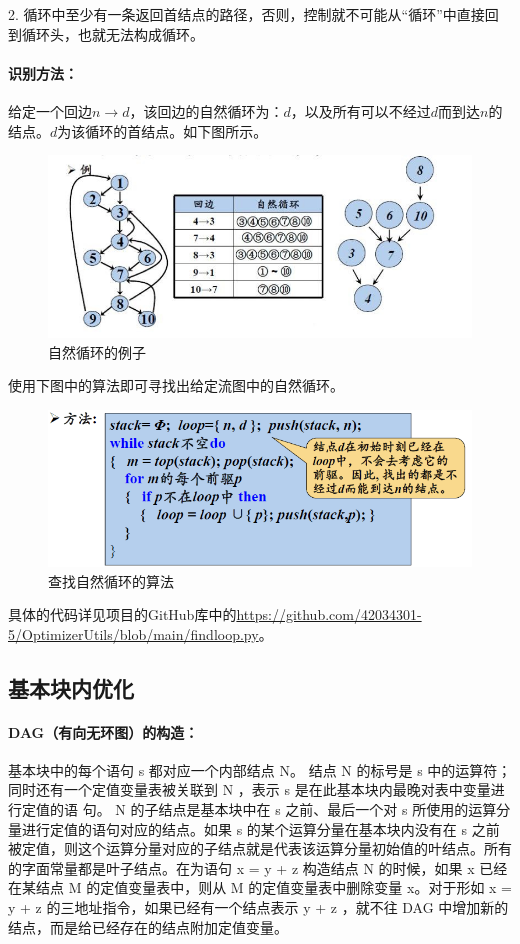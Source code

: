 \documentclass[cn,black,11pt,normal]{elegantnote}
\begin{document}
2. 循环中至少有一条返回首结点的路径，否则，控制就不可能从“循环”中直接回到循环头，也就无法构成循环。

\paragraph{识别方法：}
给定一个回边$n\rightarrow d$，该回边的自然循环为：$d$，以及所有可以不经过$d$而到达$n$的结点。$d$为该循环的首结点。如下图所示。

\begin{figure}[H]
    \centering
    \includegraphics[width=0.8\linewidth]{image/findloop1.jpg}
    \caption{自然循环的例子}
\end{figure}

使用下图中的算法即可寻找出给定流图中的自然循环。

\begin{figure}[H]
    \centering
    \includegraphics[width=0.8\linewidth]{image/findloop2.png}
    \caption{查找自然循环的算法}
\end{figure}

具体的代码详见项目的GitHub库中的\url{https://github.com/42034301-5/OptimizerUtils/blob/main/findloop.py}。

\subsection{基本块内优化}

\paragraph{DAG（有向无环图）的构造：}
基本块中的每个语句 s 都对应一个内部结点 N。
结点 N 的标号是 s 中的运算符；同时还有一个定值变量表被关联到 N ，表示 s 是在此基本块内最晚对表中变量进行定值的语
句。
N 的子结点是基本块中在 s 之前、最后一个对 s 所使用的运算分量进行定值的语句对应的结点。如果 s 的某个运算分量在基本块内没有在 s 之前被定值，则这个运算分量对应的子结点就是代表该运算分量初始值的叶结点。所有的字面常量都是叶子结点。在为语句 x = y + z 构造结点 N 的时候，如果 x 已经在某结点 M 的定值变量表中，则从 M 的定值变量表中删除变量 x。对于形如 x = y + z 的三地址指令，如果已经有一个结点表示 y + z ，就不往 DAG 中增加新的结点，而是给已经存在的结点附加定值变量。
\end{document}
